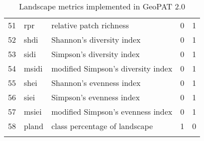 \begin{longtable}{rllrr}
   51 & rpr & relative patch richness &   0 &   1 \\ 
   52 & shdi & Shannon's diversity index &   0 &   1 \\ 
   53 & sidi & Simpson's diversity index &   0 &   1 \\ 
   54 & msidi & modified Simpson's diversity index &   0 &   1 \\ 
   55 & shei & Shannon's evenness index &   0 &   1 \\ 
   56 & siei & Simpson's evenness index &   0 &   1 \\ 
   57 & msiei & modified Simpson's evenness index &   0 &   1 \\ 
   58 & pland & class percentage of landscape &   1 &   0 \\ 
  \hline
\caption{Landscape metrics implemented in GeoPAT 2.0} 
\label{lindtable}
\end{longtable}
